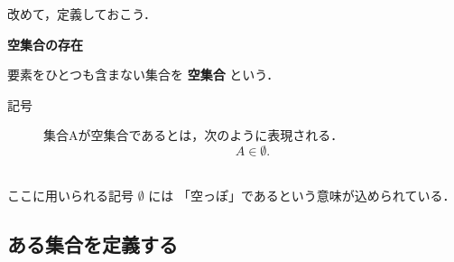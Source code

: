                     改めて，定義しておこう．
                    \\
                    \begin{itembox}[l]{\textbf{空集合の存在}}
                        \begin{dfn}
                            要素をひとつも含まない集合を \textbf{空集合} という．
                            \begin{description}
                                \item[記号] 集合Aが空集合であるとは，次のように表現される．
                                \begin{equation*}
                                    A \in \emptyset.
                                \end{equation*}
                            \end{description}
                        \end{dfn}
                    \end{itembox}
                    \\

                    ここに用いられる記号 $\emptyset$ には
                    「空っぽ」であるという意味が込められている．

            \subsection{ある集合を定義する}
